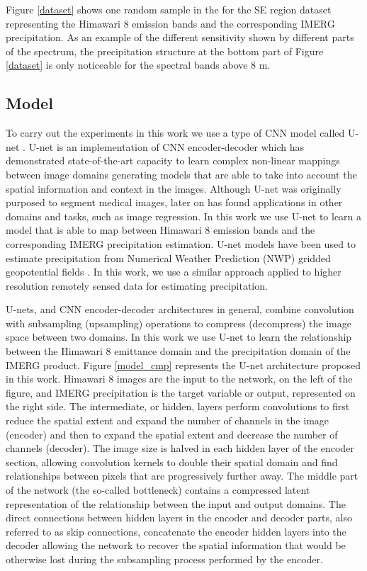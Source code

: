 \documentclass[3p,times]{elsarticle}
\begin{document}
Figure \ref{dataset} shows one random sample in the for the SE region dataset representing the Himawari 8 emission bands and the corresponding IMERG precipitation. As an example of the different sensitivity shown by different parts of the spectrum, the precipitation structure at the bottom part of Figure \ref{dataset} is only noticeable for the spectral bands above 8 \textmu m. 

\subsection{Model}

To carry out the experiments in this work we use a type of CNN model called U-net \citep{ronneberger2015u}. U-net is an implementation of CNN encoder-decoder which has demonstrated state-of-the-art capacity to learn complex non-linear mappings between image domains generating models that are able to take into account the spatial information and context in the images. Although U-net was originally purposed to segment medical images, later on has found applications in other domains and tasks, such as image regression. In this work we use U-net to learn a model that is able to map between Himawari 8 emission bands and the corresponding IMERG precipitation estimation. U-net models have been used to estimate precipitation from Numerical Weather Prediction (NWP) gridded geopotential fields \citep{larraondo2019data}. In this work, we use a similar approach applied to higher resolution remotely sensed data for estimating precipitation.

U-nets, and CNN encoder-decoder architectures in general, combine convolution with subsampling (upsampling) operations to compress (decompress) the image space between two domains. In this work we use U-net to learn the relationship between the Himawari 8 emittance domain and the precipitation domain of the IMERG product. Figure \ref{model_cmp} represents the U-net architecture proposed in this work. Himawari 8 images are the input to the network, on the left of the figure, and IMERG precipitation is the target variable or output, represented on the right side. The intermediate, or hidden, layers perform convolutions to first reduce the spatial extent and expand the number of channels in the image (encoder) and then to expand the spatial extent and decrease the number of channels (decoder). The image size is halved in each hidden layer of the encoder section, allowing convolution kernels to double their spatial domain and find relationships between pixels that are progressively further away. The middle part of the network (the so-called bottleneck) contains a compressed latent representation of the relationship between the input and output domains. The direct connections between hidden layers in the encoder and decoder parts, also referred to as skip connections, concatenate the encoder hidden layers into the decoder allowing the network to recover the spatial information that would be otherwise lost during the subsampling process performed by the encoder.
\end{document}
